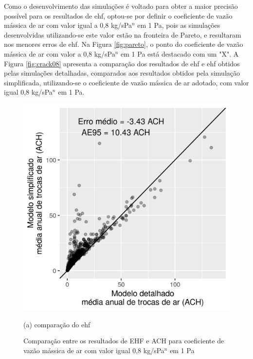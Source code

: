 \documentclass[brazil,hardcopy,openany]{ufscthesis} %
\begin{document}
Como o desenvolvimento das simulações é voltado para obter a maior precisão possível para os resultados de \acrshort{ehf}, optou-se por definir o coeficiente de vazão mássica de ar com valor igual a 0,8 kg/sPa$^n$ em 1 Pa, pois as simulações desenvolvidas utilizando-se este valor estão na fronteira de Pareto, e resultaram nos menores erros de \acrshort{ehf}.
Na Figura \ref{fig:pareto}, o ponto do coeficiente de vazão mássica de ar com valor a 0,8 kg/sPa$^n$ em 1 Pa está destacado com um "X".
A Figura \ref{fig:crack08} apresenta a comparação dos resultados de \acrshort{ehf} e \acrshort{ehf} obtidos pelas simulações detalhadas, comparados aos resultados obtidos pela simulação simplificada, utilizando-se o coeficiente de vazão mássica de ar adotado, com valor igual 0,8 kg/sPa$^n$ em 1 Pa.

\begin{figure}[h]
	\caption{Comparação entre os resultados de EHF e ACH para coeficiente de vazão mássica de ar com valor igual 0,8 kg/sPa$^n$ em 1 Pa}
	\begin{minipage}{.5\textwidth}
		\centering
		\includegraphics[width=1\linewidth]{img/cpeq_COM_80.png}
		\begin{center}
			\small{(a) comparação do \acrshort{ehf}}
		\end{center}
	\end{minipage}%

\end{figure}
\end{document}
